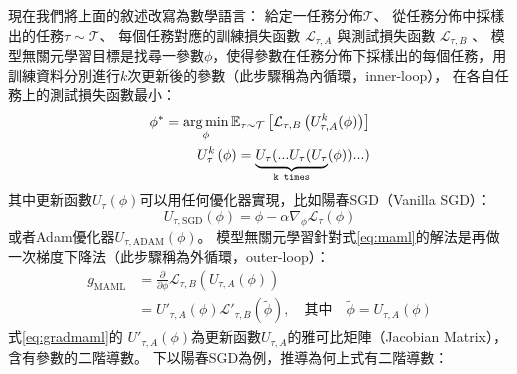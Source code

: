 現在我們將上面的敘述改寫為數學語言：
給定一任務分佈$\mathcal{T}$、
從任務分佈中採樣出的任務$\tau \sim \mathcal{T}$、
每個任務對應的訓練損失函數 $\mathcal{L}_{\tau,A}$ 與測試損失函數 $\mathcal{L}_{\tau,B}$ 、
模型無關元學習目標是找尋一參數$\phi$，使得參數在任務分佈下採樣出的每個任務，用訓練資料分別進行$k$次更新後的參數（此步驟稱為內循環，inner-loop），
在各自任務上的測試損失函數最小：
\begin{align}
    \phi^{\ast} = \operatorname*{arg\,min}_{\phi} \mathbb{E}_{\tau \sim \mathcal{T}} \left[ \mathcal{L}_{\tau,B} \left( U_{\tau,A}^{k} (\phi) \right) \right] \label{eq:maml}\\
    U_{\tau}^{k} \left( \phi \right) = \underbrace{U_{\tau} ( ... U_{\tau} ( U_{\tau} }_{\texttt{k times}} ( \phi ) ) ... )
\end{align}
其中更新函數$U_{\tau}(\phi)$可以用任何優化器實現，比如陽春SGD（Vanilla SGD）：
\begin{equation}
U_{\tau, \textrm{SGD}} \left( \phi \right) = \phi - \alpha \nabla_{\phi} \mathcal{L}_{\tau} \left( \phi \right)
\end{equation}
或者Adam優化器$U_{\tau,\textrm{ADAM}}(\phi)$\cite{kingma2014adam}。
模型無關元學習針對式\ref{eq:maml}的解法是再做一次梯度下降法（此步驟稱為外循環，outer-loop）：
\begin{align}
    g_{\mathrm{MAML}} &= \frac{\partial }{\partial \phi} \mathcal{L}_{\tau, B} \left( U_{\tau, A} (\phi) \right) \\
                      &= U'_{\tau, A} (\phi) \mathcal{L'}_{\tau, B} ( \widetilde{\phi} ),\quad \text{其中}\quad \widetilde{\phi} = U_{\tau, A} (\phi) \label{eq:gradmaml}
\end{align}
式\ref{eq:gradmaml}的 $U'_{\tau, A} (\phi)$為更新函數$U_{\tau, A}$的雅可比矩陣（Jacobian Matrix），含有參數的二階導數。
下以陽春SGD為例，推導為何上式有二階導數：

